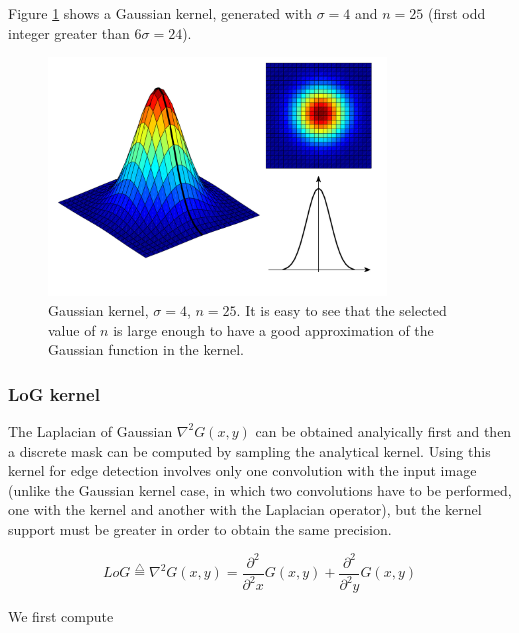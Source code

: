 \documentclass{ipol}
\numberwithin{equation}{section}
\numberwithin{table}{section}
\begin{document}
Figure \ref{fig:gaussian_kernel} shows a Gaussian kernel, generated with $\sigma = 4$ and $n = 25$ 
(first odd integer greater than $6\sigma=24$).
\begin{figure}[ht]
	\centering
	\includegraphics[width=0.8\textwidth]{kernel_gaussian.pdf}
	\caption{Gaussian kernel, $\sigma=4$, $n=25$. It is easy to see that the selected value of $n$ is 
large enough to have a good approximation of the Gaussian function in the kernel.}
	\label{fig:gaussian_kernel}
\end{figure}


\subsubsection{LoG kernel}

The Laplacian of Gaussian $\nabla^2G(x,y)$ can be obtained analyically first and then a discrete mask 
can be computed by sampling the analytical kernel. Using this kernel for edge detection involves only 
one convolution with the input image (unlike the Gaussian kernel case, in which two convolutions 
have to be performed, one with the kernel and another with the Laplacian operator), but the kernel 
support must be greater in order to obtain the same precision.


\begin{equation}
	LoG \stackrel{\triangle}{=}\nabla^2G(x,y)=\frac{\partial^2}{\partial^2 x}G(x,y) + \frac{\partial^2}{\partial^2 y}G(x,y)
\end{equation}

We first compute
\end{document}
